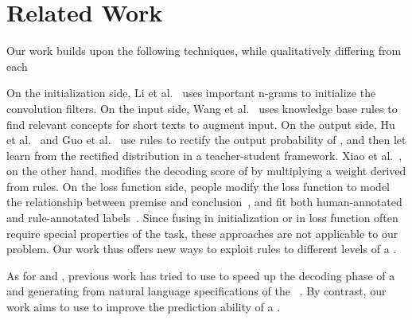 \section{Related Work}
Our work builds upon the following techniques, while qualitatively differing from each

On the initialization side, Li et al.~ uses important n-grams to initialize the convolution filters.
On the input side, Wang et al.~ uses knowledge base rules to find relevant concepts for short texts to augment input.
On the output side,
Hu et al.~ and Guo et al.~ use \FOL rules to rectify the output probability of \NN, and then let \NN learn from the rectified distribution in a teacher-student framework.
Xiao et al.~, on the other hand, modifies the decoding score of \NN by multiplying a weight derived from rules.
On the loss function side, people modify the loss function to model the relationship between premise and conclusion~\cite{demeester2016lifted}, and fit both human-annotated and rule-annotated labels~\cite{alashkar2017examples}.
Since fusing in initialization or in loss function often require special properties of the task, these approaches are not applicable to our
problem. Our work thus offers new ways to exploit \RE rules to different levels of a \NN.

 As for \NNs and \REs, previous work has tried to use \RE to speed up the decoding phase of a
\NN~\cite{strauss2016regular} and generating \REs from natural language specifications of the \RE~\cite{locascio2016neural}. By contrast,
our work aims to use \REs to improve the prediction ability of a \NN.

